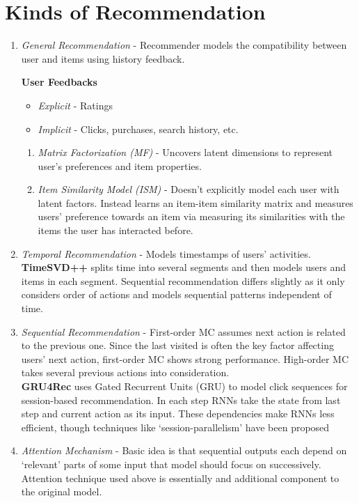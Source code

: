 \documentclass[11pt]{article}
\begin{document}
\section{Kinds of Recommendation}

\begin{enumerate}
	\item \emph{General Recommendation}
	- Recommender models the compatibility between user and items using history feedback.
	
	\textbf{User Feedbacks}
	\begin{itemize}
		\item \textit{Explicit} - Ratings
		\item \textit{Implicit} - Clicks, purchases, search history, etc.
	\end{itemize}
		\begin{enumerate}
			\item \emph{Matrix Factorization (MF)} - Uncovers latent dimensions to represent user’s preferences and item properties.
			\item \emph{Item Similarity Model (ISM)} - Doesn’t explicitly model each user with latent factors. Instead learns an item-item similarity matrix and measures users’ preference towards an item via measuring its similarities with the items the user has interacted before.
		\end{enumerate}
	
	\item \emph{Temporal Recommendation} - Models timestamps of users’ activities. \textbf{TimeSVD++} splits time into several segments and then models users and items in each segment. Sequential recommendation differs slightly as it only considers order of actions and models sequential patterns independent of time.
	
	\item \emph{Sequential Recommendation} - First-order MC assumes next action is related to the previous one. Since the last visited is often the key factor affecting users’ next action, first-order MC shows strong performance. High-order MC takes several previous actions into consideration.\\
	\textbf{GRU4Rec} uses Gated Recurrent Units (GRU) to model click sequences for session-based recommendation. In each step RNNs take the state from last step and current action as its input. These dependencies make RNNs less efficient, though techniques like ‘session-parallelism’ have been proposed
	\item \emph{Attention Mechanism} - Basic idea is that sequential outputs each depend on ‘relevant’ parts of some input that model should focus on successively.
Attention technique used above is essentially and additional component to the original model.

\end{enumerate}
\end{document}

